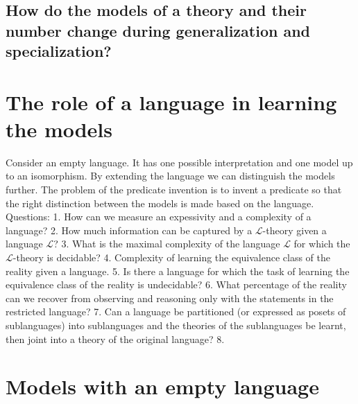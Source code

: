 \subsection{How do the models of a theory and their number change during generalization and specialization?}
\section{The role of a language in learning the models}
Consider an empty language. It has one possible interpretation and one model up to an isomorphism.
By extending the language we can distinguish the models further. The problem of the predicate invention is to invent a predicate so that the right distinction between the models is made based on the language.
Questions:
1. How can we measure an expessivity and a complexity of a language?
2. How much information can be captured by a $\mathcal{L}$-theory given a language $\mathcal{L}$?
3. What is the maximal complexity of the language $\mathcal{L}$ for which the $\mathcal{L}$-theory is decidable?
4. Complexity of learning the equivalence class of the reality given a language.
5. Is there a language for which the task of learning the equivalence class of the reality is undecidable?
6. What percentage of the reality can we recover from observing and reasoning only with the statements in the restricted language?
7. Can a language be partitioned (or expressed as posets of sublanguages) into sublanguages and the theories of the sublanguages be learnt, then joint into a theory of the original language?
8. 
\section{Models with an empty language}

